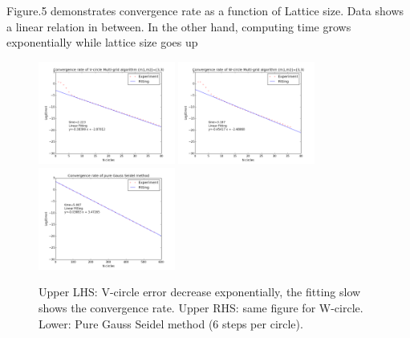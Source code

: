 \documentclass[12pt]{article}
\begin{document}
Figure.5 demonstrates convergence rate as a function of Lattice size. Data shows a linear relation in between. In the other hand, computing time grows exponentially while lattice size goes up

\begin{figure}[h!]
	\begin{center}
		\includegraphics[width=0.4\textwidth]{V_converge_rate.png}
		\includegraphics[width=0.4\textwidth]{W_converge_rate.png}
		\includegraphics[width=0.4\textwidth]{GS_converge_rate.png}
		\caption{Upper LHS: V-circle error decrease exponentially, the fitting slow shows the convergence rate. Upper RHS: same figure for W-circle. Lower: Pure Gauss Seidel method (6 steps per circle).}
		\label{fig4}
	\end{center}
\end{figure}
\end{document}
